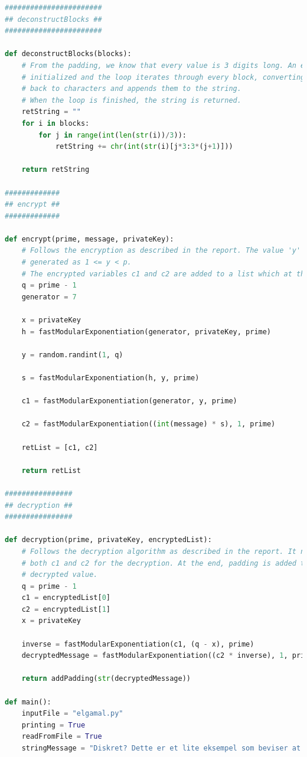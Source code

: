 \documentclass{article}
\begin{document}
\begin{lstlisting}[language=Python,breaklines=true,showspaces=false]
#######################
## deconstructBlocks ##
#######################

def deconstructBlocks(blocks):
    # From the padding, we know that every value is 3 digits long. An empty string is
    # initialized and the loop iterates through every block, converting the ascii values
    # back to characters and appends them to the string.
    # When the loop is finished, the string is returned.
    retString = ""
    for i in blocks:
        for j in range(int(len(str(i))/3)):
            retString += chr(int(str(i)[j*3:3*(j+1)]))

    return retString

#############
## encrypt ##
#############

def encrypt(prime, message, privateKey):
    # Follows the encryption as described in the report. The value 'y' is randomly
    # generated as 1 <= y < p.
    # The encrypted variables c1 and c2 are added to a list which at the end is returned.
    q = prime - 1
    generator = 7

    x = privateKey
    h = fastModularExponentiation(generator, privateKey, prime)

    y = random.randint(1, q)

    s = fastModularExponentiation(h, y, prime)

    c1 = fastModularExponentiation(generator, y, prime)

    c2 = fastModularExponentiation((int(message) * s), 1, prime)

    retList = [c1, c2]

    return retList

################
## decryption ##
################

def decryption(prime, privateKey, encryptedList):
    # Follows the decryption algorithm as described in the report. It needs to use
    # both c1 and c2 for the decryption. At the end, padding is added to the
    # decrypted value.
    q = prime - 1
    c1 = encryptedList[0]
    c2 = encryptedList[1]
    x = privateKey

    inverse = fastModularExponentiation(c1, (q - x), prime)
    decryptedMessage = fastModularExponentiation((c2 * inverse), 1, prime)

    return addPadding(str(decryptedMessage))

def main():
    inputFile = "elgamal.py"
    printing = True
    readFromFile = True
    stringMessage = "Diskret? Dette er et lite eksempel som beviser at koden fungerer."


\end{lstlisting}
\end{document}
